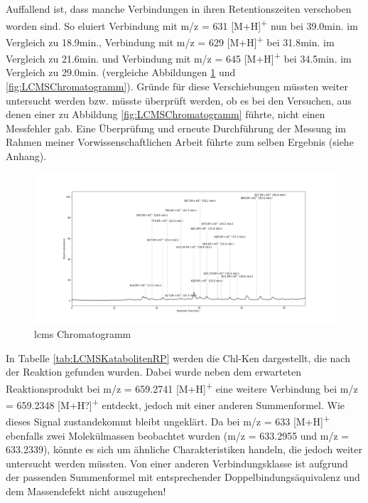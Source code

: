 Auffallend ist, dass manche Verbindungen in ihren Retentionszeiten verschoben worden sind. So eluiert Verbindung mit m/z = 631 [M+H]\textsuperscript{+} nun bei 39.0min. im Vergleich zu 18.9min., Verbindung mit m/z = 629 [M+H]\textsuperscript{+} bei 31.8min. im Vergleich zu 21.6min. und Verbindung mit m/z = 645 [M+H]\textsuperscript{+} bei 34.5min. im Vergleich zu 29.0min. (vergleiche Abbildungen \ref{fig:LCMSCChromatogrammRP} und \ref{fig:LCMSChromatogramm}). Gründe für diese Verschiebungen müssten weiter untersucht werden bzw. müsste überprüft werden, ob es bei den Versuchen, aus denen einer zu Abbildung \ref{fig:LCMSChromatogramm} führte, nicht einen Messfehler gab. Eine Überprüfung und erneute Durchführung der Messung im Rahmen meiner Vorwissenschaftlichen Arbeit führte zum selben Ergebnis (siehe Anhang). 

\begin{figure}[!htbp]
  \centering
  \includegraphics[width=1.4\textwidth, center]{figures/Kapitel6/Reaktion3h/Kuerbis_Analyse_Reaktion3h_Ganzes_Spektrum.png}
  \caption[LC-MS Chromatogramm nach 3 h Reaktionsdauer, Quelle: Autor]{\gls{lcms} Chromatogramm}
  \label{fig:LCMSCChromatogrammRP}
\end{figure}

In Tabelle \ref{tab:LCMSKatabolitenRP} werden die \gls{Chl-K}en dargestellt, die nach der Reaktion gefunden wurden. Dabei wurde neben dem erwarteten Reaktionsprodukt bei m/z = 659.2741 [M+H]\textsuperscript{+} eine weitere Verbindung bei m/z = 659.2348 [M+H?]\textsuperscript{+} entdeckt, jedoch mit einer anderen Summenformel. Wie dieses Signal zustandekommt bleibt ungeklärt. Da bei m/z = 633 [M+H]\textsuperscript{+} ebenfalls zwei Molekülmassen beobachtet wurden (m/z = 633.2955 und m/z = 633.2339), könnte es sich um ähnliche Charakteristiken handeln, die jedoch weiter untersucht werden müssten. Von einer anderen Verbindungsklasse ist aufgrund der passenden Summenformel mit entsprechender Doppelbindungsäquivalenz und dem Massendefekt nicht auszugehen! \\


